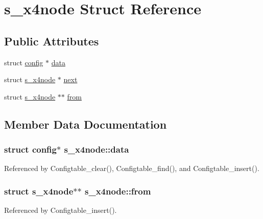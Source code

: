 \hypertarget{structs__x4node}{\section{s\-\_\-x4node Struct Reference}
\label{structs__x4node}
}
\subsection*{Public Attributes}
\begin{DoxyCompactItemize}
\item 
struct \hyperlink{structconfig}{config} $\ast$ \hyperlink{structs__x4node_a6cfd7e7aaa0e556be2566537a6bf4a3b}{data}
\item 
struct \hyperlink{structs__x4node}{s\-\_\-x4node} $\ast$ \hyperlink{structs__x4node_a0d737ff9b01f81956ae193b770112c30}{next}
\item 
struct \hyperlink{structs__x4node}{s\-\_\-x4node} $\ast$$\ast$ \hyperlink{structs__x4node_a39d360c0c30fda7da0ddc52f6cdc7c1e}{from}
\end{DoxyCompactItemize}


\subsection{Member Data Documentation}
\hypertarget{structs__x4node_a6cfd7e7aaa0e556be2566537a6bf4a3b}{
\subsubsection[{data}]{\setlength{\rightskip}{0pt plus 5cm}struct {\bf config}$\ast$ s\-\_\-x4node\-::data}}\label{structs__x4node_a6cfd7e7aaa0e556be2566537a6bf4a3b}


Referenced by Configtable\-\_\-clear(), Configtable\-\_\-find(), and Configtable\-\_\-insert().

\hypertarget{structs__x4node_a39d360c0c30fda7da0ddc52f6cdc7c1e}{
\subsubsection[{from}]{\setlength{\rightskip}{0pt plus 5cm}struct {\bf s\-\_\-x4node}$\ast$$\ast$ s\-\_\-x4node\-::from}}\label{structs__x4node_a39d360c0c30fda7da0ddc52f6cdc7c1e}


Referenced by Configtable\-\_\-insert().

